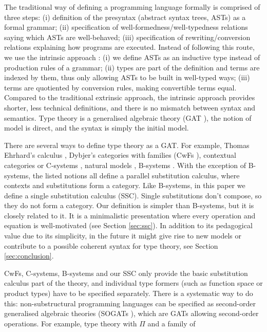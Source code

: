 \documentclass[sigplan,10pt,anonymous,review]{acmart}\settopmatter{printfolios=true,printccs=false,printacmref=false}
\begin{document}
The traditional way of defining a programming language formally
\cite{DBLP:books/cu/Ha2016,Pierce:SF2,plfa22.08} is comprised of three
steps: (i) definition of the presyntax (abstract syntax trees, ASTs)
as a formal grammar; (ii) specification of
well-formedness/well-typedness relations saying which ASTs are
well-behaved; (iii) specification of rewriting/conversion relations
explaining how programs are executed. Instead of following this route,
we use the intrinsic approach
\cite{DBLP:conf/csl/AltenkirchR99,DBLP:conf/popl/AltenkirchK16}: (i)
we define ASTs as an inductive type instead of production rules of a
grammar; (ii) types are part of the definition and terms are indexed
by them, thus only allowing ASTs to be built in well-typed ways; (iii)
terms are quotiented by conversion rules, making convertible terms
equal. Compared to the traditional extrinsic approach, the intrinsic approach provides
shorter, less technical definitions, and there
is no mismatch between syntax and semantics. Type theory is a
generalised algebraic theory (GAT
\cite{DBLP:journals/apal/Cartmell86}), the notion of model is direct,
and the syntax is simply the initial model. 

There are several ways to define type theory as a GAT. For example,
Thomas Ehrhard's calculus \cite{ehrhard,coquandEhrhard}, Dybjer's
categories with families (CwFs
\cite{DBLP:conf/types/Dybjer95,Castellan2021}), contextual categories
or C-systems
\cite{DBLP:journals/apal/Cartmell86,DBLP:journals/lmcs/AhrensLV18},
natural models \cite{DBLP:journals/mscs/Awodey18}, B-systems
\cite{AHRENS_EMMENEGGER_NORTH_RIJKE_2023}.  With the exception of
B-systems, the listed notions all define a parallel substitution
calculus, where contexts and substitutions form a category. Like
B-systems, in this paper we define a single substitution calculus
(SSC). Single substitutions don't compose, so they do not form a
category. Our definition is simpler than B-systems, but it is closely
related to it. It is a minimalistic presentation where every operation
and equation is well-motivated (see Section \ref{sec:ssc}). In
addition to its pedagogical value due to its simplicity, in the future
it might give rise to new models or contribute to a possible coherent
syntax for type theory, see Section \ref{sec:conclusion}.

CwFs, C-systems, B-systems and our SSC only provide the basic
substitution calculus part of the theory, and individual type formers
(such as function space or product types) have to be specified
separately. There is a systematic way to do this: non-substructural
programming languages can be specified as second-order generalised
algebraic theories (SOGATs \cite{DBLP:conf/fscd/KaposiX24}), which are
GATs allowing second-order operations. For example, type theory with
$\Pi$ and a family of 
\end{document}
